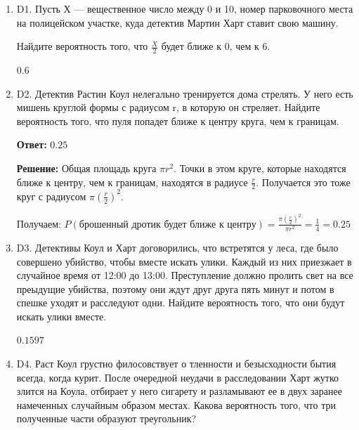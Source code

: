 \documentclass[12pt]{article}
\def \P{P}
\newenvironment{problem}{}{}
\newenvironment{sol}{}{} %
\begin{document}
\begin{enumerate}

\begin{problem}
\item[D1.] Пусть Х — вещественное число между 0 и 10, номер парковочного места на полицейском участке, куда детектив Мартин Харт ставит свою машину. 

Найдите вероятность того, что $\frac{X}{2}$ будет ближе к 0, чем к 6.

\begin{sol}
$0.6$
\end{sol}
\end{problem}


\begin{problem}
\item[D2.] Детектив Растин Коул нелегально тренируется дома стрелять. У него есть мишень круглой формы с радиусом r, в которую он стреляет. Найдите вероятность того, что пуля попадет ближе к центру круга, чем к границам.

\begin{sol}
\textbf{Ответ:} $0.25$

\textbf{Решение:} Общая площадь круга $\pi r^2$. Точки в этом круге, которые находятся ближе к центру, чем к границам, находятся в радиусе $\frac{r}{2}$. Получается это тоже круг с радиусом $\pi (\frac{r}{2})^2$. 

Получаем: $\P(\text{брошенный дротик будет ближе к центру}) = \frac{\pi(\frac{r}{2})^2}{\pi r^2} = \frac{1}{4} = 0.25$
\end{sol}
\end{problem}


\begin{problem}
\item[D3.] Детективы Коул и Харт договорились, что встретятся у леса, где было совершено убийство, чтобы вместе искать улики. Каждый из них приезжает в случайное время от 12:00 до 13:00. Преступление должно пролить свет на все преыдущие убийства, поэтому они ждут друг друга пять минут и потом в спешке уходят и расследуют одни. Найдите вероятность того, что они будут искать улики вместе.

\begin{sol}
$0.1597$
\end{sol}
\end{problem}


\begin{problem}
\item[D4.] Раст Коул грустно филосовствует о тленности и безысходности бытия  всегда, когда курит. После очередной неудачи в расследовании Харт жутко злится на Коула, отбирает у него сигарету и разламывают ее в двух заранее намеченных случайным образом местах. Какова вероятность того, что три полученные части образуют треугольник?


\end{problem}
\end{enumerate}
\end{document}
